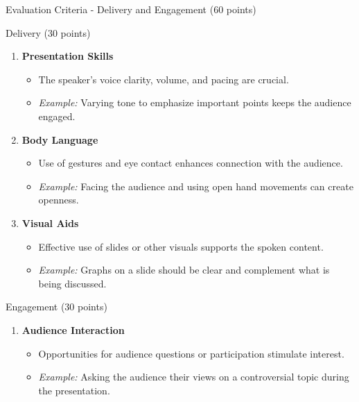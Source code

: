 \documentclass[aspectratio=169]{beamer}
\begin{document}
\begin{frame}[fragile]{Evaluation Criteria - Delivery and Engagement (60 points)}
    \begin{block}{Delivery (30 points)}
        \begin{enumerate}
            \item \textbf{Presentation Skills}
            \begin{itemize}
                \item The speaker's voice clarity, volume, and pacing are crucial.
                \item \textit{Example:} Varying tone to emphasize important points keeps the audience engaged.
            \end{itemize}

            \item \textbf{Body Language}
            \begin{itemize}
                \item Use of gestures and eye contact enhances connection with the audience.
                \item \textit{Example:} Facing the audience and using open hand movements can create openness.
            \end{itemize}

            \item \textbf{Visual Aids}
            \begin{itemize}
                \item Effective use of slides or other visuals supports the spoken content.
                \item \textit{Example:} Graphs on a slide should be clear and complement what is being discussed.
            \end{itemize}
        \end{enumerate}
    \end{block}

    \vspace{0.5cm}

    \begin{block}{Engagement (30 points)}
        \begin{enumerate}
            \item \textbf{Audience Interaction}
            \begin{itemize}
                \item Opportunities for audience questions or participation stimulate interest.
                \item \textit{Example:} Asking the audience their views on a controversial topic during the presentation.
            \end{itemize}


\end{enumerate}
\end{block}
\end{frame}
\end{document}
